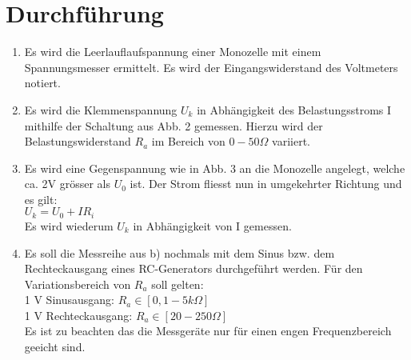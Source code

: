 \section{Durchführung}
\label{sec:Durchführung}

\begin{enumerate}
  \begin{enumerate}
    \item Es wird die Leerlauflaufspannung einer Monozelle mit einem Spannungsmesser ermittelt.
    Es wird der Eingangswiderstand des Voltmeters notiert.

    \item Es wird die Klemmenspannung $U_k$ in Abhängigkeit des Belastungsstroms I mithilfe
    der Schaltung aus Abb. 2 gemessen.
    Hierzu wird der Belastungswiderstand $R_a$ im Bereich von $ 0-50 \Omega$ variiert.

    \item Es wird eine Gegenspannung wie in Abb. 3 an die Monozelle angelegt, welche ca. 2V
    grösser als $U_0$ ist. Der Strom fliesst nun in umgekehrter Richtung und es gilt:\\
    $U_k = U_0 + IR_i$\\
    Es wird wiederum $U_k$ in Abhängigkeit von I gemessen.

    \item Es soll die Messreihe aus b) nochmals mit dem Sinus bzw. dem
    Rechteckausgang eines RC-Generators durchgeführt werden. Für den Variationsbereich
    von $R_a$ soll gelten:\\
    1 V Sinusausgang: $R_a \in [0,1 - 5 k\Omega]$\\
    1 V Rechteckausgang: $R_a \in [20 -250 \Omega]$\\
    Es ist zu beachten das die Messgeräte nur für einen engen Frequenzbereich geeicht sind.
  \end{enumerate}
\end{enumerate}
